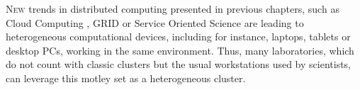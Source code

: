 \label{chap:adaptive}
\minitoc\mtcskip
\vfill
\lettrine{N}{ew} trends in distributed computing presented in previous chapters, such as Cloud Computing \cite{meri2013cloud}, GRID
\cite{Altunay2011OpenScience} or Service Oriented Science
\cite{Foster2005Science} are %
leading to heterogeneous computational devices, including for instance, laptops,
tablets or desktop PCs, working in the same
environment. Thus, many laboratories, which do not count with classic
clusters but the usual workstations used by scientists, can leverage
this motley set as a heterogeneous cluster. %

